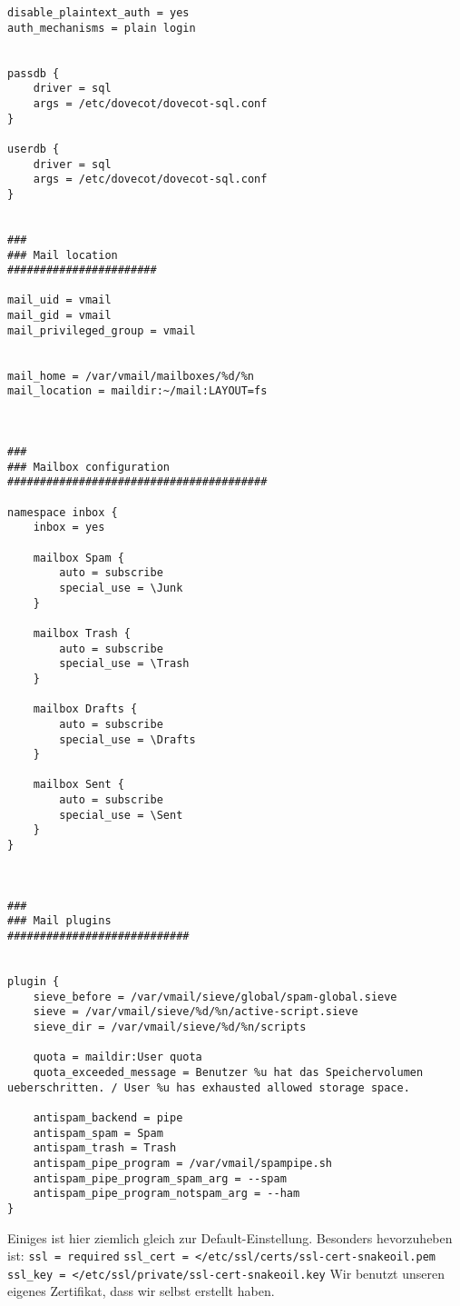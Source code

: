 \begin{lstlisting}[caption=dovecot.conf]
disable_plaintext_auth = yes
auth_mechanisms = plain login


passdb {
    driver = sql
    args = /etc/dovecot/dovecot-sql.conf
}

userdb {
    driver = sql
    args = /etc/dovecot/dovecot-sql.conf
}


###
### Mail location
#######################

mail_uid = vmail
mail_gid = vmail
mail_privileged_group = vmail


mail_home = /var/vmail/mailboxes/%d/%n
mail_location = maildir:~/mail:LAYOUT=fs



###
### Mailbox configuration
########################################

namespace inbox {
    inbox = yes

    mailbox Spam {
        auto = subscribe
        special_use = \Junk
    }

    mailbox Trash {
        auto = subscribe
        special_use = \Trash
    }

    mailbox Drafts {
        auto = subscribe
        special_use = \Drafts
    }

    mailbox Sent {
        auto = subscribe
        special_use = \Sent
    }
}



###
### Mail plugins
############################


plugin {
    sieve_before = /var/vmail/sieve/global/spam-global.sieve   
    sieve = /var/vmail/sieve/%d/%n/active-script.sieve
    sieve_dir = /var/vmail/sieve/%d/%n/scripts

    quota = maildir:User quota
    quota_exceeded_message = Benutzer %u hat das Speichervolumen ueberschritten. / User %u has exhausted allowed storage space.

    antispam_backend = pipe
    antispam_spam = Spam
    antispam_trash = Trash
    antispam_pipe_program = /var/vmail/spampipe.sh
    antispam_pipe_program_spam_arg = --spam
    antispam_pipe_program_notspam_arg = --ham
}
\end{lstlisting}

Einiges ist hier ziemlich gleich zur Default-Einstellung. Besonders hevorzuheben ist:\newline
\verb|ssl = required|\newline
\verb|ssl_cert = </etc/ssl/certs/ssl-cert-snakeoil.pem|\newline
\verb|ssl_key = </etc/ssl/private/ssl-cert-snakeoil.key|\newline
Wir benutzt unseren eigenes Zertifikat, dass wir selbst erstellt haben.

